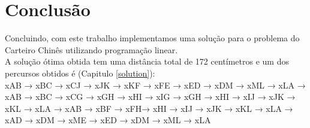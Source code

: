 \documentclass[a4paper]{report}
\begin{document}
\chapter{Conclusão}
Concluindo, com este trabalho implementamos uma solução para o problema do
Carteiro Chinês utilizando programação linear.\\
A solução ótima obtida tem uma distância total de 172 centímetros e um dos
percursos obtidos é (Capitulo \ref{solution}):\\
xAB → xBC → xCJ → xJK → xKF → xFE → xED → xDM → xML → xLA →
xAB → xBC → xCG → xGH → xHI  → xIG → xGH → xHI → xIJ → xJK  → xKL  → xLA →
xAB → xBF → xFH→ xHI  → xIJ → xJK  → xKL  → xLA →
xAD → xDM → xME → xED  → xDM → xML → xLA\\
\end{document}
